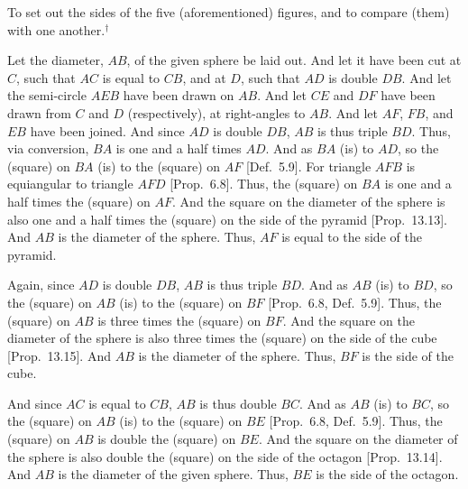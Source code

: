 \begin{Parallel}{}{}
{To set out the sides of the five (aforementioned) figures, and to compare (them)
with one another.$^\dag$

\epsfysize=2.25in
\centerline{}

Let the diameter, $AB$, of the given sphere be laid out. And let it
have been cut at $C$, such that $AC$ is equal to $CB$, and at $D$, such
that $AD$ is double $DB$. And let the semi-circle $AEB$ have been
drawn on $AB$. And let $CE$ and $DF$ have been drawn from $C$
and $D$ (respectively), at right-angles to $AB$. And let $AF$, $FB$,
and $EB$ have been joined. And since $AD$ is double $DB$, 
$AB$ is thus triple $BD$. Thus, via conversion, $BA$ is one and
a half times $AD$. And as $BA$ (is) to $AD$, so the (square)
on $BA$ (is) to the (square) on $AF$ [Def.~5.9].  For
triangle $AFB$ is equiangular to triangle $AFD$ [Prop.~6.8]. 
Thus, the (square) on $BA$ is one and a half times the (square)
on $AF$. And the square on the diameter of the sphere
is also one and a half times the (square) on the side of the pyramid
[Prop.~13.13].  And $AB$ is the diameter of the sphere. Thus,
$AF$ is equal to the side of the pyramid.

Again, since $AD$ is double $DB$,  $AB$ is thus triple $BD$. And
as $AB$ (is) to $BD$, so the (square) on $AB$ (is) to the (square)
on $BF$ [Prop.~6.8, Def.~5.9]. Thus, the (square) on $AB$
is three times the (square) on $BF$.  And the square on the diameter of
the sphere is also three times the (square) on the side of the cube [Prop.~13.15]. And $AB$ is the diameter of the sphere. Thus, $BF$ is the
side of the cube.

And since $AC$ is equal to $CB$, $AB$ is thus double $BC$.  And
as $AB$ (is) to $BC$, so the (square) on $AB$ (is) to the (square)
on $BE$ [Prop.~6.8, Def.~5.9]. Thus, the (square) on $AB$
is double the (square) on $BE$. And the square on the diameter
of the sphere is also double the (square) on the side of the octagon [Prop.~13.14]. And $AB$ is the diameter of the given sphere. Thus,
$BE$ is the side of the octagon.

}
\end{Parallel}

